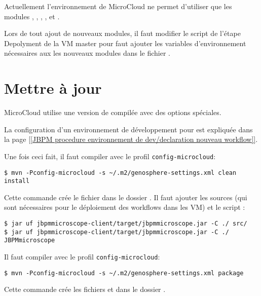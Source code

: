 Actuellement l'environnement de MicroCloud ne permet d'utiliser que les modules , , , ,  et .

\begin{mycolorbox}
    Lors de tout ajout de nouveaux modules, il faut modifier le script de l'étape Depolyment de la VM master
    pour faut ajouter les variables d'environnement nécessaires aux les nouveaux modules
    dans le fichier .
\end{mycolorbox}

\section{Mettre à jour } \label{sec:nouvelle_version_jbpmmicroscope}

MicroCloud utilise une version de  compilée avec des options spéciales.

La configuration d'un environnement de développement pour  est expliquée
dans la page \href{https://intranet.genoscope.cns.fr/agc/redmine/projects/microscopeworkflow/wiki/JBPMprocedure}{[[JBPM procedure environnement de dev/declaration nouveau workflow]]}.

Une fois ceci fait, il faut compiler  avec le profil \texttt{config-microcloud}:
\begin{lstlisting}[style=bash]
$ mvn -Pconfig-microcloud -s ~/.m2/genosphere-settings.xml clean install
\end{lstlisting}
Cette commande crée le fichier  dans le dossier .
Il faut ajouter les sources (qui sont nécessaires pour le déploiement des workflows dans les VM) et le script :
\begin{lstlisting}[style=bash]
$ jar uf jbpmmicroscope-client/target/jbpmmicroscope.jar -C ./ src/
$ jar uf jbpmmicroscope-client/target/jbpmmicroscope.jar -C ./ JBPMmicroscope
\end{lstlisting}

Il faut compiler  avec le profil \texttt{config-microcloud}:
\begin{lstlisting}[style=bash]
$ mvn -Pconfig-microcloud -s ~/.m2/genosphere-settings.xml package
\end{lstlisting}
Cette commande crée les fichiers  et 
dans le dossier .

